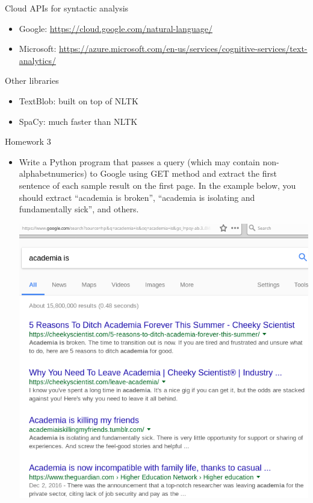 \documentclass[11pt]{beamer}
\begin{document}
\begin{frame}{Cloud APIs for syntactic analysis}
\begin{itemize}
 \item Google: \url{https://cloud.google.com/natural-language/}
 \item Microsoft: \url{https://azure.microsoft.com/en-us/services/cognitive-services/text-analytics/}
 \end{itemize}
\end{frame}

\begin{frame}{Other libraries}
 \begin{itemize}
  \item TextBlob: built on top of NLTK
  \item SpaCy: much faster than NLTK
 \end{itemize}
\end{frame}


\begin{frame}{Homework  3}
\begin{itemize}
 \item Write a Python program that passes a query (which may contain non-alphabetnumerics) to Google using GET method and extract the first sentence of each sample result on the first page. In the example below, you should extract ``academia is broken'',  ``academia is isolating and fundamentally sick'', and others. 
 
 \includegraphics[width=.5\textwidth]{google_academia.png}
\end{itemize}
 
\end{frame}

% 
\end{document}
